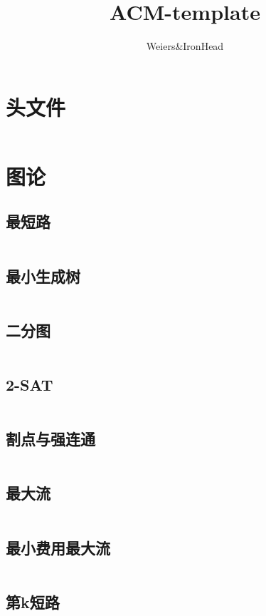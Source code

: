 \documentclass[a4paper,13.6pt]{article}
\author{Weiers\&IronHead}
\title{ACM-template}
\begin{document}
\maketitle
\vspace{3cm}
\begin{CJK}{UTF8}{gbsn}
    
\newpage

\tableofcontents
\newpage

\section{头文件}
\inputminted{c++}{../ACM_Template/Others/Include.cpp}
\newpage
\section{图论}
\subsection{最短路}
\inputminted{c++}{../ACM_Template/Graph/Shortest_Path.cpp}
\subsection{最小生成树}
\inputminted{c++}{../ACM_Template/Graph/Minimal_Spanning_Tree.cpp}
\subsection{二分图}
\inputminted{c++}{../ACM_Template/Graph/Bipartite_Graph_Matching.cpp}
\subsection{2-SAT}
\inputminted{c++}{../ACM_Template/Graph/2-SAT.cpp}
\subsection{割点与强连通}
\inputminted{c++}{../ACM_Template/Graph/Strongly_Connected_Component.cpp}
\subsection{最大流}
\inputminted{c++}{../ACM_Template/Graph/Network_Flow.cpp}
\subsection{最小费用最大流}
\inputminted{c++}{../ACM_Template/Graph/MinCost_MaxFlow.cpp}
\subsection{第k短路}
\inputminted{c++}{../ACM_Template/Graph/The_K_Shortest_Path.cpp}

\end{CJK}
\end{document}
